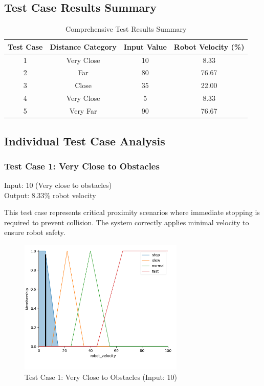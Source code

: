 \documentclass[11pt,a4paper]{article}
\begin{document}
\subsection{Test Case Results Summary}

\begin{table}[H]
\centering
\caption{Comprehensive Test Results Summary}
\begin{tabular}{|c|c|c|c|}
\hline
\textbf{Test Case} & \textbf{Distance Category} & \textbf{Input Value} & \textbf{Robot Velocity (\%)} \\
\hline
1 & Very Close & 10 & 8.33 \\
\hline
2 & Far & 80 & 76.67 \\
\hline
3 & Close & 35 & 22.00 \\
\hline
4 & Very Close & 5 & 8.33 \\
\hline
5 & Very Far & 90 & 76.67 \\
\hline
\end{tabular}
\end{table}

\subsection{Individual Test Case Analysis}

\subsubsection{Test Case 1: Very Close to Obstacles}
Input: 10 (Very close to obstacles) \\
Output: 8.33\% robot velocity

This test case represents critical proximity scenarios where immediate stopping is required to prevent collision. The system correctly applies minimal velocity to ensure robot safety.

\begin{figure}[H]
\centering
\includegraphics[width=0.7\textwidth]{plots/test1.png}
\caption{Test Case 1: Very Close to Obstacles (Input: 10)}
\end{figure}
\end{document}
